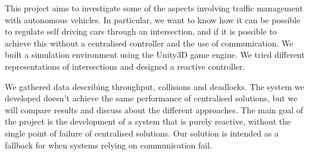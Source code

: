 \begin{em}
This project aims to investigate some of the aspects involving traffic management with autonomous vehicles.
In particular, we want to know how it can be possible to regulate self driving cars through an intersection, and if it is possible to achieve this without a centralised controller and the use of communication.
We built a simulation environment using the Unity3D game engine. We tried different representations of intersections and designed a reactive controller.

We gathered data describing throughput, collisions and deadlocks.
The system we developed doesn't achieve the same performance of centralised solutions, 
but we will compare results and discuss about the different approaches.
The main goal of the project is the development of a system that is purely reactive, without the single point of failure of centralised solutions.
Our solution is intended as a fallback for when systems relying on communication fail.
\end{em}